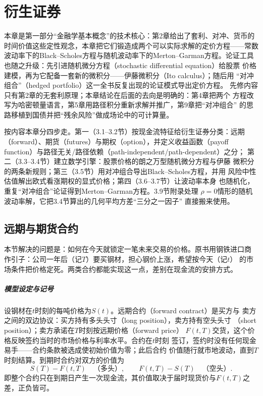 \chapter{衍生证券}

本章是第一部分“金融学基本概念”的技术核心：第2章给出了套利、对冲、货币的
时间价值这些定性观念，本章把它们锻造成两个可以实际求解的定价方程——常数
波动率下的Black--Scholes方程与随机波动率下的Merton--Garman方程。论证工具
也随之升级：先引进随机微分方程（stochastic differential equation）给股票
价格建模，再为它配备一套新的微积分——伊藤微积分（Ito calculus）；随后用
“对冲组合”（hedged portfolio）这一全书反复出现的论证模式导出定价方程。
先修内容只有第2章的无套利原理；本章结论在后面的去向是明确的：第4章把两个
方程改写为哈密顿量语言，第5章用路径积分重新求解并推广，第9章把“对冲组合”
的思路移植到国债并把“残余风险”做成场论中的可计算量。

按内容本章分四步走。第一（3.1--3.2节）按现金流特征给衍生证券分类：远期
（forward）、期货（futures）与期权（option），并定义收益函数（payoff
function）与路径无关/路径依赖（path-independent/path-dependent）之分；
第二（3.3--3.4节）建立数学引擎：股票价格的朗之万型随机微分方程与伊藤
微积分的两条新规则；第三（3.5节）用对冲组合导出Black--Scholes方程，并用
风险中性估值解出欧式看涨期权的显式价格；第四（3.6--3.7节）让波动率本身
也随机化，重复“对冲组合”论证得到Merton--Garman方程。3.9节附录处理
$\rho=0$情形的随机波动率解，它把3.4节算出的几何平均方差“三分之一因子”
直接搬来使用。

\section{远期与期货合约}

本节解决的问题是：如何在今天就锁定一笔未来交易的价格。原书用钢铁进口商
作引子：公司一年后（记$T$）要买钢材，担心钢价上涨，希望按今天（记$t$）
的市场条件把价格定死。两类合约都能实现这一点，差别在现金流的安排方式。

\paragraph{模型设定与记号}
设钢材在$t$时刻的每吨价格为$S(t)$。远期合约（forward contract）是买方与
卖方之间的双边协议：买方持有多头头寸（long position），卖方持有空头头寸
（short position）；卖方承诺在$T$时刻按远期价格（forward price）
$F(t,T)$交货，这个价格反映签约当时的市场价格与利率水平。合约在$t$时刻
签订，签约时没有任何现金易手——合约条款被选成使初始价值为零；此后合约
价值随行就市地波动，直到$T$时刻结算。到期时合约对双方的价值为
\begin{equation*}
S(T)-F(t,T)\quad\text{（多头）},\qquad F(t,T)-S(T)\quad\text{（空头）}.
\end{equation*}
即整个合约只在到期日产生一次现金流，其价值取决于届时现货价与$F(t,T)$之
差，正负皆可。

